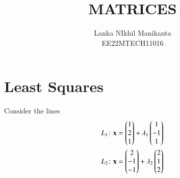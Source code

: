 \documentclass[journal,12pt,twocolumn]{IEEEtran}
\begin{document}
\makeatletter
{}
\makeatother

\let\StandardTheFigure\thefigure
\let\vec\mathbf
\let\j\jmath
\renewcommand{\thefigure}{\theproblem}



\def\putbox#1#2#3{\makebox[0in][l]{\makebox[#1][l]{}\raisebox{\baselineskip}[0in][0in]{\raisebox{#2}[0in][0in]{#3}}}}
     \def\rightbox#1{\makebox[0in][r]{#1}}
     \def\centbox#1{\makebox[0in]{#1}}
     \def\topbox#1{\raisebox{-\baselineskip}[0in][0in]{#1}}
     \def\midbox#1{\raisebox{-0.5\baselineskip}[0in][0in]{#1}}

\vspace{3cm}

\title{
	MATRICES
}
\author{
	Lanka NIkhil Manikanta\\
	EE22MTECH11016
}

\maketitle

\newpage

\tableofcontents

\bigskip

\renewcommand{\thefigure}{\theenumi}
\renewcommand{\thetable}{\theenumi}

\section{Least Squares}
Consider the lines 
\begin{align}
    L_1\colon \vec{x}=\myvec{1\\2\\1}+\lambda_1\myvec{1\\-1\\1}\label{eq:pseudo:1}\\
    L_2\colon \vec{x}=\myvec{2\\-1\\-1}+\lambda_2\myvec{2\\1\\2}\label{eq:pseudo:2}
\end{align}
\end{document}
